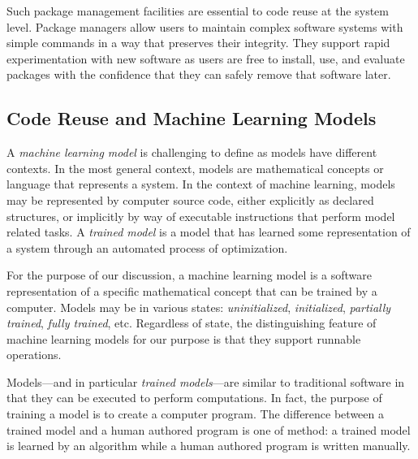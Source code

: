 \documentclass{article}
\begin{document}
Such package management facilities are essential to code reuse at the
system level. Package managers allow users to maintain complex
software systems with simple commands in a way that preserves their
integrity. They support rapid experimentation with new software as
users are free to install, use, and evaluate packages with the
confidence that they can safely remove that software later.

\iffalse
Package managers promote healthy software ecosystems by facilitating
software \emph{publishing}. Software authors use packaging tools to
create the installable software units---\emph{packages}---that are so
easily consumed by users. By publishing packaged software, developers
signify that their software will work as advertised if installed using
the applicable tools.

Software ecosystems that are enabled by package managers include
Python, JavaScript, Ruby, Go, and R. The GNU/Linux operating system
itself is an ecosystem of package management ecosystems including
packaging schemes from Debian, RedHat, Gentoo, and Arch
distributions. Package managers are established cornerstones of
software reuse across languages and operating systems.
\fi

\subsection{Code Reuse and Machine Learning Models}

A \emph{machine learning model} is challenging to define as models
have different contexts. In the most general context, models are
mathematical concepts or language that represents a system. In the
context of machine learning, models may be represented by computer
source code, either explicitly as declared structures, or implicitly
by way of executable instructions that perform model related tasks. A
\emph{trained model} is a model that has learned some representation
of a system through an automated process of optimization.

For the purpose of our discussion, a machine learning model is a
software representation of a specific mathematical concept that can be
trained by a computer. Models may be in various states:
\emph{uninitialized}, \emph{initialized}, \emph{partially trained},
\emph{fully trained}, etc. Regardless of state, the distinguishing
feature of machine learning models for our purpose is that they
support runnable operations.

Models---and in particular \emph{trained models}---are similar to
traditional software in that they can be executed to perform
computations. In fact, the purpose of training a model is to create a
computer program. The difference between a trained model and a human
authored program is one of method: a trained model is learned by an
algorithm while a human authored program is written manually.
\end{document}
